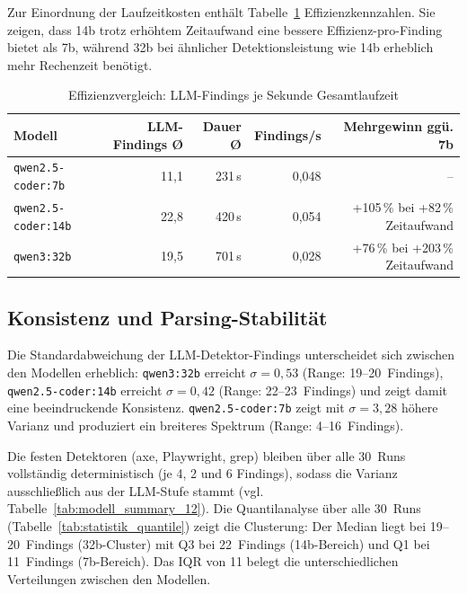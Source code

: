 Zur Einordnung der Laufzeitkosten enthält Tabelle~\ref{tab:effizienzvergleich} Effizienzkennzahlen. Sie zeigen, dass 14b trotz erhöhtem Zeitaufwand eine bessere Effizienz-pro-Finding bietet als 7b, während 32b bei ähnlicher Detektionsleistung wie 14b erheblich mehr Rechenzeit benötigt.

\begin{table}[htbp]
\centering
\small
\renewcommand{\arraystretch}{1.15}
\begin{tabular}{@{}lrrrr@{}}
\toprule
\textbf{Modell} & \textbf{\ac{LLM}-Findings Ø} & \textbf{Dauer Ø} & \textbf{Findings/s} & \textbf{Mehrgewinn ggü. 7b} \\
\midrule
\texttt{qwen2.5-coder:7b}  & 11,1 & 231\,s & 0,048 & -- \\
\texttt{qwen2.5-coder:14b} & 22,8 & 420\,s & 0,054 & +105\,\% bei +82\,\% Zeitaufwand \\
\texttt{qwen3:32b}         & 19,5 & 701\,s & 0,028 & +76\,\% bei +203\,\% Zeitaufwand \\
\bottomrule
\end{tabular}
\caption{Effizienzvergleich: \ac{LLM}-Findings je Sekunde Gesamtlaufzeit}
\label{tab:effizienzvergleich}
\end{table}

\subsection{Konsistenz und Parsing-Stabilität}
\label{sec:effizienz_konsistenz}

Die Standardabweichung der \ac{LLM}-Detektor-Findings unterscheidet sich zwischen den Modellen erheblich: \texttt{qwen3:32b} erreicht $\sigma = 0{,}53$ (Range: 19--20~Findings), \texttt{qwen2.5-coder:14b} erreicht $\sigma = 0{,}42$ (Range: 22--23~Findings) und zeigt damit eine beeindruckende Konsistenz. \texttt{qwen2.5-coder:7b} zeigt mit $\sigma = 3{,}28$ höhere Varianz und produziert ein breiteres Spektrum (Range: 4--16~Findings).

Die festen Detektoren (axe, Playwright, grep) bleiben über alle 30~Runs vollständig deterministisch (je 4, 2 und 6 Findings), sodass die Varianz ausschließlich aus der \ac{LLM}-Stufe stammt (vgl. Tabelle~\ref{tab:modell_summary_12}). Die Quantilanalyse über alle 30~Runs (Tabelle~\ref{tab:statistik_quantile}) zeigt die Clusterung: Der Median liegt bei 19--20~Findings (32b-Cluster) mit Q3 bei 22~Findings (14b-Bereich) und Q1 bei 11~Findings (7b-Bereich). Das \ac{IQR} von 11 belegt die unterschiedlichen Verteilungen zwischen den Modellen.

